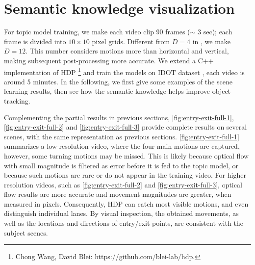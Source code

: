 \section{Semantic knowledge visualization}
\label{sec:hdp-res}

For topic model training, we make each video clip 90 frames ($\sim$ 3 sec); each frame is divided into $10\times10$ pixel grids. Different from $D=4$ in \cite{wang2009unsupervised,kuettel2010s}, we make $D=12$. This number considers motions more than horizontal and vertical, making subsequent post-processing more accurate. 
We extend a C++ implementation of HDP \footnote{Chong Wang, David Blei: https://github.com/blei-lab/hdp.} and train the models on IDOT dataset \cite{yanziVehicleTracker}, each video is around 5 minutes. 
In the following, we first give some examples of the scene learning results, then see how the semantic knowledge helps improve object tracking.

Complementing the partial results in previous sections, \ref{fig:entry-exit-full-1}, \ref{fig:entry-exit-full-2} and \ref{fig:entry-exit-full-3} provide complete results on several scenes, 
with the same representation as previous sections.
\ref{fig:entry-exit-full-1} summarizes a low-resolution video, where the four main motions are captured, however, some turning motions may be missed. This is likely because optical flow with small magnitude is filtered as error before it is fed to the topic model, or because such motions are rare or do not appear in the training video.
For higher resolution videos, such as \ref{fig:entry-exit-full-2} and \ref{fig:entry-exit-full-3}, optical flow results are more accurate and movement magnitudes are greater, when measured in pixels. Consequently, HDP can catch most visible motions, and even distinguish individual lanes.
By visual inspection, the obtained movements, as well as the locations and directions of entry/exit points, are consistent with the subject scenes. 

